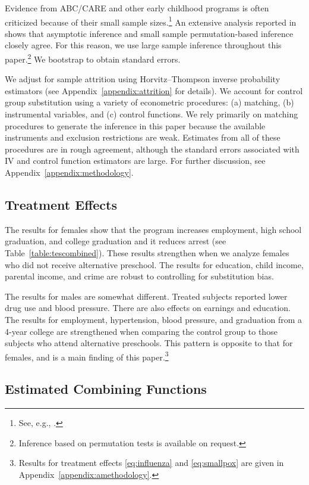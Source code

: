 Evidence from ABC/CARE and other early childhood programs is often criticized because of their small sample sizes.\footnote{See, e.g., \cite{Murray_2013_GivingKids_JJHBOOK}.} An extensive analysis reported in \citet{Campbell_Conti_etal_2014_EarlyChildhoodInvestments} shows that asymptotic inference and small sample permutation-based inference closely agree. For this reason, we use large sample inference throughout this paper.\footnote{Inference based on permutation tests is available on request.} We bootstrap to obtain standard errors.

We adjust for sample attrition using Horvitz--Thompson \citeyear{Horvitz_Thompson_1952_JASA} inverse probability estimators (see Appendix~\ref{appendix:attrition} for details). We account for control group substitution using a variety of econometric procedures: (a) matching, (b) instrumental variables, and (c) control functions. We rely primarily on matching procedures to generate the inference in this paper because the available instruments and exclusion restrictions are weak. Estimates from all of these procedures are in rough agreement, although the standard errors associated with IV and control function estimators are large. For further discussion, see Appendix~\ref{appendix:methodology}.

\subsection{Treatment Effects}

The results for females show that the program increases employment, high school graduation, and college graduation and it reduces arrest (see Table~\ref{table:tescombined}). These results strengthen when we analyze females who did not receive alternative preschool. The results for education, child income, parental income, and crime are robust to controlling for substitution bias.

The results for males are somewhat different. Treated subjects reported lower drug use and blood pressure. There are also effects on earnings and education. The results for employment, hypertension, blood pressure, and graduation from a 4-year college are strengthened when comparing the control group to those subjects who attend alternative preschools. This pattern is opposite to that for females, and is a main finding of this paper.\footnote{Results for treatment effects \eqref{eq:influenza} and \eqref{eq:smallpox} are given in Appendix~\ref{appendix:amethodology}.}

\subsection{Estimated Combining Functions}

